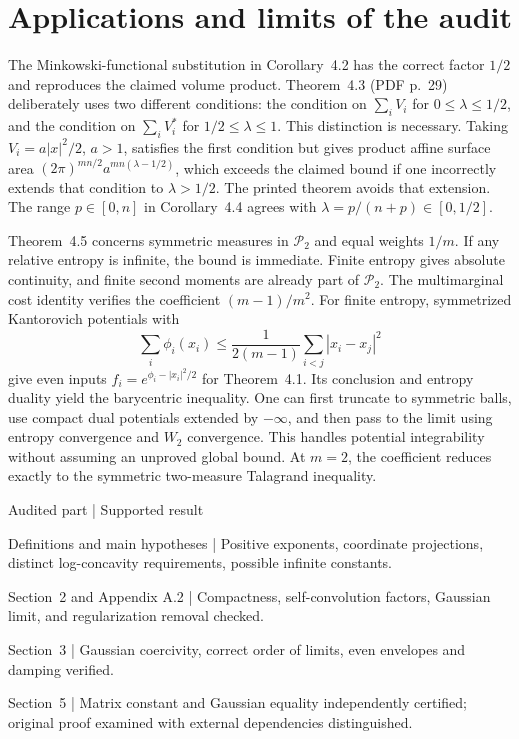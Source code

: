 \documentclass[10pt]{article}
\begin{document}
\section*{Applications and limits of the audit}
The Minkowski-functional substitution in Corollary 4.2 has the correct factor \(1/2\) and reproduces the claimed volume product. Theorem 4.3 (PDF p. 29) deliberately uses two different conditions: the condition on \(\sum_i V_i\) for \(0\le\lambda\le1/2\), and the condition on \(\sum_i V_i^*\) for \(1/2\le\lambda\le1\). This distinction is necessary. Taking \(V_i=a|x|^2/2\), \(a>1\), satisfies the first condition but gives product affine surface area \((2\pi)^{mn/2}a^{mn(\lambda-1/2)}\), which exceeds the claimed bound if one incorrectly extends that condition to \(\lambda>1/2\). The printed theorem avoids that extension. The range \(p\in[0,n]\) in Corollary 4.4 agrees with \(\lambda=p/(n+p)\in[0,1/2]\).\par
Theorem 4.5 concerns symmetric measures in \(\mathcal P_2\) and equal weights \(1/m\). If any relative entropy is infinite, the bound is immediate. Finite entropy gives absolute continuity, and finite second moments are already part of \(\mathcal P_2\). The multimarginal cost identity verifies the coefficient \((m-1)/m^2\). For finite entropy, symmetrized Kantorovich potentials with \[\sum_i\phi_i(x_i)\le
 \frac{1}{2(m-1)}\sum_{i<j}|x_i-x_j|^2\] give even inputs \(f_i=e^{\phi_i-|x_i|^2/2}\) for Theorem 4.1. Its conclusion and entropy duality yield the barycentric inequality. One can first truncate to symmetric balls, use compact dual potentials extended by \(-\infty\), and then pass to the limit using entropy convergence and \(W_2\) convergence. This handles potential integrability without assuming an unproved global bound. At \(m=2\), the coefficient reduces exactly to the symmetric two-measure Talagrand inequality.\par
Audited part | Supported result\par
Definitions and main hypotheses | Positive exponents, coordinate projections, distinct log-concavity requirements, possible infinite constants.\par
Section 2 and Appendix A.2 | Compactness, self-convolution factors, Gaussian limit, and regularization removal checked.\par
Section 3 | Gaussian coercivity, correct order of limits, even envelopes and damping verified.\par
Section 5 | Matrix constant and Gaussian equality independently certified; original proof examined with external dependencies distinguished.\par
\end{document}
